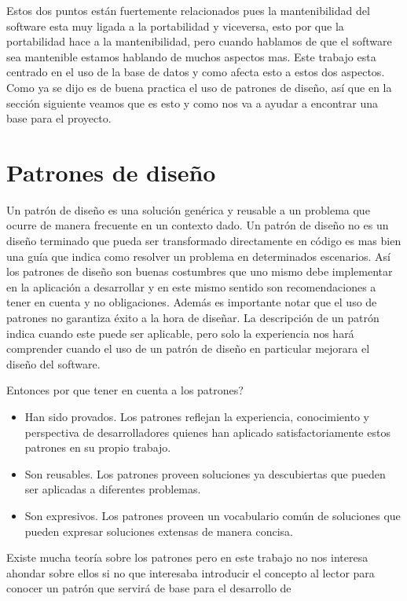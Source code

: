 Estos dos puntos están fuertemente relacionados pues la mantenibilidad del software esta muy ligada a la portabilidad y viceversa, esto por que la portabilidad hace a la mantenibilidad, pero cuando hablamos de que el software sea mantenible estamos hablando de muchos aspectos mas. Este trabajo esta centrado en el uso de la base de datos y como afecta esto a estos dos aspectos. Como ya se dijo es de buena practica el uso de patrones de diseño, así que en la sección siguiente veamos que es esto y como nos va a ayudar a encontrar una base para el proyecto. 
\section{Patrones de diseño}
Un patrón de diseño es una solución genérica y reusable  a un problema que ocurre de manera frecuente en un contexto dado. Un patrón de diseño no es un diseño terminado que pueda ser transformado directamente en código es mas bien una guía que indica como resolver un problema en determinados escenarios. Así los patrones de diseño son buenas costumbres que uno mismo debe implementar en la aplicación a desarrollar y en este mismo sentido son recomendaciones a tener en cuenta y no obligaciones\cite{Metsker:2002:DPJ}. Además es importante notar que el uso de patrones no garantiza éxito a la hora de diseñar. La descripción de un patrón indica cuando este puede ser aplicable, pero solo la experiencia nos hará comprender cuando el uso de un patrón de diseño en particular mejorara el diseño del software\cite{java:patrones}.


Entonces por que tener en cuenta a los patrones?
\begin{itemize}
\item Han sido provados. Los patrones reflejan la experiencia, conocimiento y perspectiva de desarrolladores quienes han aplicado satisfactoriamente estos patrones en su propio trabajo.

\item Son reusables. Los patrones proveen soluciones ya descubiertas que pueden ser aplicadas a diferentes problemas.

\item Son expresivos. Los patrones proveen un vocabulario común de soluciones que pueden expresar soluciones extensas de manera concisa.
\end{itemize}
Existe mucha teoría sobre los patrones pero en este trabajo no nos interesa ahondar sobre ellos si no que interesaba introducir el concepto al lector para conocer un patrón que servirá de base para el desarrollo de \jj
